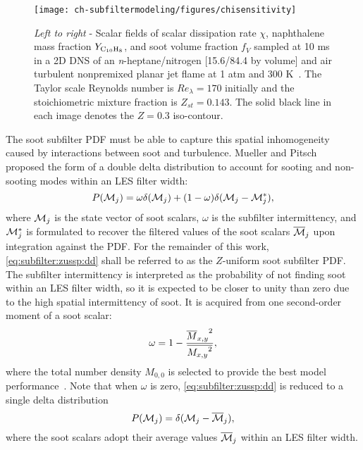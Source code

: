 \begin{figure}[htb]
  \begin{center}
    \texttt{[image: ch-subfiltermodeling/figures/chisensitivity]}
    \caption[Spatial Variability of  and Soot Fields]{\textit{Left to right} - Scalar fields of scalar dissipation rate $\chi$, naphthalene mass fraction $Y_{\ce{C10H8}}$, and soot volume fraction $f_V$ sampled at 10 ms in a 2D DNS of an \textit{n}-heptane/nitrogen [15.6/84.4 by volume] and air turbulent nonpremixed planar jet flame at 1 atm and 300 K~\cite{bisetti2012}. The Taylor scale Reynolds number is $Re_{\lambda} = 170$ initially and the stoichiometric mixture fraction is $Z_{st} = 0.143$. The solid black line in each image denotes the $Z = 0.3$ iso-contour.} %
    \label{fig:subfilter:zussp:chisensitivity}
  \end{center}
\end{figure}

The soot subfilter PDF must be able to capture this spatial inhomogeneity caused by interactions between soot and turbulence. Mueller and Pitsch~\cite{subfilterpdf2011} proposed the form of a double delta distribution to account for sooting and non-sooting modes within an LES filter width:
\begin{equation}\label{eq:subfilter:zussp:dd}
  P(\mathcal{M}_j) = \omega\delta(\mathcal{M}_j) + (1 - \omega)\delta(\mathcal{M}_j - \mathcal{M}_j^*),
\end{equation}
where $\mathcal{M}_j$ is the state vector of soot scalars, $\omega$ is the subfilter intermittency, and $\mathcal{M}_j^*$ is formulated to recover the filtered values of the soot scalars $\overline{\mathcal{M}}_j$ upon integration against the PDF. For the remainder of this work, \cref{eq:subfilter:zussp:dd} shall be referred to as the $Z$-uniform soot subfilter PDF. The subfilter intermittency is interpreted as the probability of not finding soot within an LES filter width, so it is expected to be closer to unity than zero due to the high spatial intermittency of soot. It is acquired from one second-order moment of a soot scalar:
\begin{equation}\label{eq:subfilter:zussp:omega}
  \omega = 1 - \frac{{\overline{M}_{x,y}}^2}{\overline{{M_{x,y}}^2}},
\end{equation}
where the total number density $M_{0,0}$ is selected to provide the best model performance~\cite{subfilterpdf2011}. Note that when $\omega$ is zero, \cref{eq:subfilter:zussp:dd} is reduced to a single delta distribution
\begin{equation}\label{eq:subfilter:zussp:sd}
  P(\mathcal{M}_j) = \delta(\mathcal{M}_j - \overline{\mathcal{M}}_j),
\end{equation}
where the soot scalars adopt their average values $\overline{\mathcal{M}}_j$ within an LES filter width.

